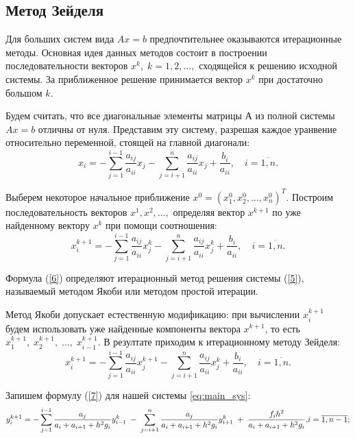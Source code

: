 \documentclass[a4paper,12pt]{article}
\begin{document}
{\subsection{Метод Зейделя}
\hspace*{1.25cm}Для больших систем вида $Ax=b$ предпочтительнее оказываются итерационные методы. 
Основная идея данных методов состоит в построении последовательности векторов $x^k, \; k=1,2,\dots,$ 
сходящейся к решению исходной системы. За приближенное решение принимается вектор $x^k$ при достаточно большом $k$.

Будем считать, что все диагональные элементы матрицы $А$ из полной системы $Ax=b$ отличны от нуля. 
Представим эту систему, разрешая каждое уранвение относительно переменной, стоящей на главной диагонали: 
\begin{equation}
x_i = - \sum\limits_{j=1}^{i-1} \frac{a_{ij}}{a_{ii}}x_j - \sum\limits_{j=i+1}^n \frac{a_{ij}}{a_{ii}}x_j+\frac{b_i}{a_{ii}}, \quad i = \overline{1,n}.
 \label{5}
\end{equation}

Выберем некоторое начальное приближение $x^0=(x_1^0, x_2^0, {\dots}, x_n^0)^T$. 
Построим последова\-тель\-ность векторов $x^1, x^2, {\dots},$ определяя вектор $x^{k+1}$ по уже найденному вектору $x^k$ при помощи соотношения: 
\begin{equation}
x_i^{k+1}= - \sum\limits_{j=1}^{i-1} \frac{a_{ij}}{a_{ii}}x_j^k - \sum\limits_{j=i+1}^n \frac{a_{ij}}{a_{ii}}x_j^k+\frac{b_i}{a_{ii}}, \quad i = \overline{1,n}. 
 \label{6}
\end{equation}

Формула (\ref{6}) определяют итерационный метод решения системы (\ref{5}), называемый мето\-дом Якоби или методом простой итерации.

Метод Якоби допускает естественную модификацию: при вычислении $x_i^{k+1}$ 
будем использовать уже найденные компоненты вектора $x^{k+1}$, то есть $x_1^{k+1},\;x_2^{k+1},\;\dots,\;x_{i-1}^{k+1}$. 
В резултате приходим к итерационному методу Зейделя:
\begin{equation}
    x_i^{k+1}= - \sum\limits_{j=1}^{i-1} \frac{a_{ij}}{a_{ii}}x_j^{k+1} - \sum\limits_{j=i+1}^n \frac{a_{ij}}{a_{ii}}x_j^k+\frac{b_i}{a_{ii}}, \quad i = \overline{1,n}. 
     \label{7}
\end{equation}

Запишем формулу (\ref{7}) для нашей системы \eqref{eq:main_sys}:
\begin{equation}
    y_i^{k+1}=  -\sum\limits_{j=1}^{i-1}\frac{a_j}{a_i+a_{i+1}+h^2 g_i}y_{i-1}^k \; - \;\sum\limits_{j=i+1}^{n}\frac{a_{j}}{a_i+a_{i+1}+h^2 g_i}y_{i+1}^k\; +\; \frac{f_i h^2}{a_i+a_{i+1}+h^2 g_i},$$$$
    i=\overline{1, n-1};
     \label{8}
\end{equation}

}
\end{document}
